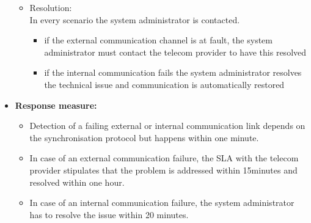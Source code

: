 \documentclass[english]{sareport}
\begin{document}
\begin{itemize}
\begin{itemize}
            \item Resolution:\\
            In every scenario the system administrator is contacted.
            \begin{itemize}
            	\item if the external communication channel is at fault, the system administrator must contact the telecom provider to have this resolved
            	\item if the internal communication fails the system administrator resolves the technical issue and communication is automatically restored
            \end{itemize}
        \end{itemize}

    \item \textbf{Response measure:}
        \begin{itemize}
            \item Detection of a failing external or internal communication link depends on the synchronisation protocol but happens within one minute.
            \item In case of an external communication failure, the SLA with the telecom provider stipulates that the problem is addressed within 15minutes and resolved within one hour. 
            \item In case of an internal communication failure, the system administrator has to resolve the issue within 20 minutes.
        \end{itemize}
\end{itemize}
\end{document}
